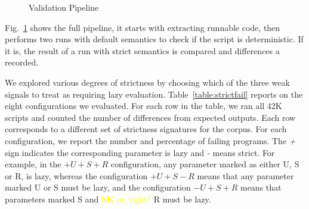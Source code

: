 \documentclass[review,creen,acmsmall]{acmart}
\newcommand{\authorcomment}[3]{\xspace\textcolor{#1}{{\bf #2} #3}\xspace}
\newcommand{\SK}[1]{\authorcomment{yellow}{SK}{#1}}
\begin{document}
\begin{figure}[!b]
{
  }
  \caption{Validation Pipeline}\label{fig:validationPipeline}
\end{figure}

Fig.~\ref{fig:validationPipeline} shows the full pipeline, it starts with extracting
runnable code, then performs two runs with default semantics to check if the
script is deterministic. If it is, the result of a run with strict semantics is
compared and differences a recorded.


We explored various degrees of strictness by choosing which of the three weak
signals to treat as requiring lazy evaluation. Table~\ref{table:strictfail}
reports on the eight configurations we evaluated. For each row in the table, we
ran all 42K scripts and counted the number of differences from expected outputs.
Each row corresponds to a different set of strictness signatures for the corpus.
For each configuration, we report the number and percentage of failing programs.
The \emph{+} sign indicates the corresponding parameter is lazy and \emph{-}
means strict. For example, in the $+U+S+R$ configuration, any parameter marked
as either U, S or R, is lazy, whereas the configuration $+U+S-R$ means that any
parameter marked U or S must be lazy, and the configuration $-U+S+R$ means that
parameters marked S and \SK{or, right?} R must be lazy.
\end{document}
